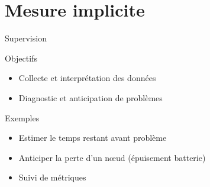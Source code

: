 \section{Mesure implicite} %
\label{sec:supervision_active_&_passive}

\begin{frame}{Supervision}

\begin{alertblock}{Objectifs}
  \begin{itemize}
    \item Collecte et interprétation des données
    \item Diagnostic et anticipation de problèmes
  \end{itemize}
\end{alertblock}

  \begin{block}{Exemples}
    \begin{itemize}
      \item Estimer le temps restant avant problème
      \item Anticiper la perte d'un nœud (épuisement batterie)
      \item Suivi de métriques
    \end{itemize}
  \end{block}


\end{frame}



  



